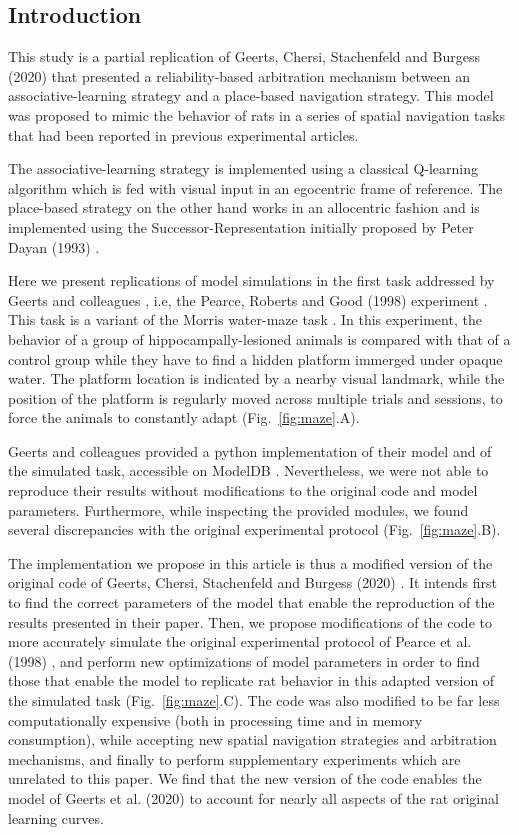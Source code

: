 \subsection{Introduction}

This study is a partial replication of Geerts, Chersi, Stachenfeld and Burgess (2020) \cite{Geerts:2020} that presented a reliability-based arbitration mechanism between an associative-learning strategy and a place-based navigation strategy. This model was proposed to mimic the behavior of rats in a series of spatial navigation tasks that had been reported in previous experimental articles.

The associative-learning strategy is implemented using a classical Q-learning algorithm which is fed with visual input in an egocentric frame of reference. The place-based strategy on the other hand works in an allocentric fashion and is implemented using the Successor-Representation initially proposed by Peter Dayan (1993) \cite{Dayan:1993}.

Here we present replications of model simulations in the first task addressed by Geerts and colleagues \cite{Geerts:2020}, i.e, the Pearce, Roberts and Good (1998) experiment \cite{Pearce:1998}. This task is a variant of the Morris water-maze task \cite{Morris:1982}. In this experiment, the behavior of a group of hippocampally-lesioned animals is compared with that of a control group while they have to find a hidden platform immerged under opaque water. The platform location is indicated by a nearby visual landmark, while the position of the platform is regularly moved across multiple trials and sessions, to force the animals to constantly adapt (Fig.~\ref{fig:maze}.A).

Geerts and colleagues provided a python implementation of their model and of the simulated task, accessible on ModelDB \cite{modeldb}. Nevertheless, we were not able to reproduce their results without modifications to the original code and model parameters. Furthermore, while inspecting the provided modules, we found several discrepancies with the original experimental protocol (Fig.~\ref{fig:maze}.B).

The implementation we propose in this article is thus a modified version of the original code of Geerts, Chersi, Stachenfeld and Burgess (2020) \cite{Geerts:2020}. It intends first to find the correct parameters of the model that enable the reproduction of the results presented in their paper. Then, we propose modifications of the code to more accurately simulate the original experimental protocol of Pearce et al. (1998) \cite{Pearce:1998}, and perform new optimizations of model parameters in order to find those that enable the model to replicate rat behavior in this adapted version of the simulated task (Fig.~\ref{fig:maze}.C). The code was also modified to be far less computationally expensive (both in processing time and in memory consumption), while accepting new spatial navigation strategies and arbitration mechanisms, and finally to perform supplementary experiments which are unrelated to this paper. We find that the new version of the code enables the model of Geerts et al. (2020) \cite{Geerts:2020} to account for nearly all aspects of the rat original learning curves.

